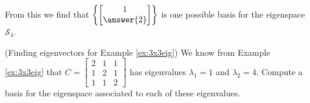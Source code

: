 \documentclass{ximera}
\begin{document}
\begin{example}
\begin{explanation}
From this we find that $\left\{\begin{bmatrix}1\\\answer{2}\end{bmatrix}\right\}$ is one possible basis for the eigenspace $\mathcal{S}_4$.
\end{explanation}
\end{example}

\begin{example}\label{ex:eigvectors3x3eig} (Finding eigenvectors for Example \ref{ex:3x3eig})
We know from Example \ref{ex:3x3eig} that $C=\begin{bmatrix} 2 & 1 & 1\\ 1 & 2 & 1\\ 1 & 1 & 2\end{bmatrix}$ has eigenvalues $\lambda_1=1$ and $\lambda_2=4$.  Compute a basis for the eigenspace associated to each of these eigenvalues.
\end{example}
\end{document}
